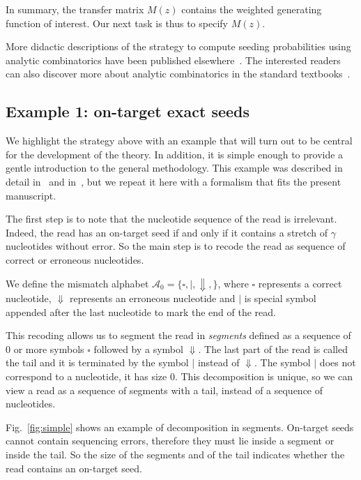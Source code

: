 \documentclass{article}
\begin{document}
In summary, the transfer matrix $M(z)$ contains the weighted generating
function of interest. Our next task is thus to specify $M(z)$.

More didactic descriptions of the strategy to compute seeding
probabilities using analytic combinatorics have been published
elsewhere~\cite{filion2017analytic,filion2018analytic}. The interested
readers can also discover more about analytic combinatorics in the
standard textbooks~\cite{flajolet2009analytic,sedgewick2013introduction}.


\subsection{Example 1: on-target exact seeds}
\label{sec:sample_exact}

We highlight the strategy above with an example that will turn out to be
central for the development of the theory. In addition, it is simple
enough to provide a gentle introduction to the general methodology. This
example was described in detail in~\cite{filion2017analytic} and
in~\cite{filion2018analytic}, but we repeat it here with a formalism that
fits the present manuscript.

The first step is to note that the nucleotide sequence of the read is
irrelevant. Indeed, the read has an on-target seed if and only if it
contains a stretch of $\gamma$ nucleotides without error. So the main step
is to recode the read as sequence of correct or erroneous nucleotides.

We define the mismatch alphabet $\mathcal{A}_0 = \{\square, |,
\Downarrow,\}$, where $\square$ represents a correct nucleotide,
$\Downarrow$ represents an erroneous nucleotide and $|$ is special symbol
appended after the last nucleotide to mark the end of the read.

This recoding allows us to segment the read in \emph{segments} defined as
a sequence of 0 or more symbols $\square$ followed by a symbol
$\Downarrow$. The last part of the read is called the tail and it is
terminated by the symbol $|$ instead of $\Downarrow$. The symbol $|$ does
not correspond to a nucleotide, it has size 0. This decomposition is
unique, so we can view a read as a sequence of segments with a tail,
instead of a sequence of nucleotides.

Fig.~\ref{fig:simple} shows an example of decomposition in segments.
On-target seeds cannot contain sequencing errors, therefore they must lie
inside a segment or inside the tail. So the size of the segments and of
the tail indicates whether the read contains an on-target seed.
\end{document}
